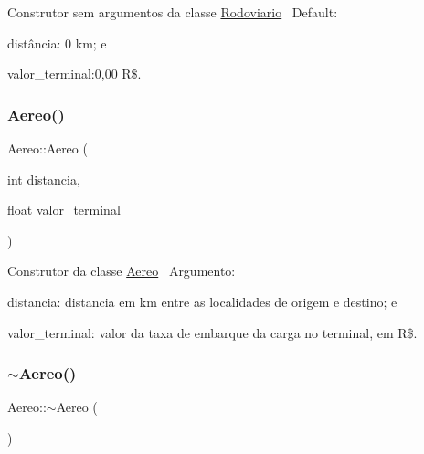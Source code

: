 Construtor sem argumentos da classe \hyperlink{classRodoviario}{Rodoviario}~\newline
 Default\+:~\newline

\begin{DoxyItemize}
\item distância\+: 0 km; e
\item valor\+\_\+terminal\+:0,00 R\$.~\newline

\end{DoxyItemize}\mbox{\label{classAereo_a1630b4982dcbc3ff2705bf1c30bc4712}} 
\subsubsection{\texorpdfstring{Aereo()}{Aereo()}\hspace{0.1cm}{\footnotesize\ttfamily [2/2]}}
{\footnotesize\ttfamily Aereo\+::\+Aereo (\begin{DoxyParamCaption}\item[{int}]{distancia,  }\item[{float}]{valor\+\_\+terminal }\end{DoxyParamCaption})}

Construtor da classe \hyperlink{classAereo}{Aereo}~\newline
 Argumento\+:
\begin{DoxyItemize}
\item distancia\+: distancia em km entre as localidades de origem e destino; e
\item valor\+\_\+terminal\+: valor da taxa de embarque da carga no terminal, em R\$.~\newline

\end{DoxyItemize}\mbox{\label{classAereo_a1fdc694bc1f263674c755e99fe08c33c}} 
\subsubsection{\texorpdfstring{$\sim$\+Aereo()}{~Aereo()}}
{\footnotesize\ttfamily Aereo\+::$\sim$\+Aereo (\begin{DoxyParamCaption}{ }\end{DoxyParamCaption})}


